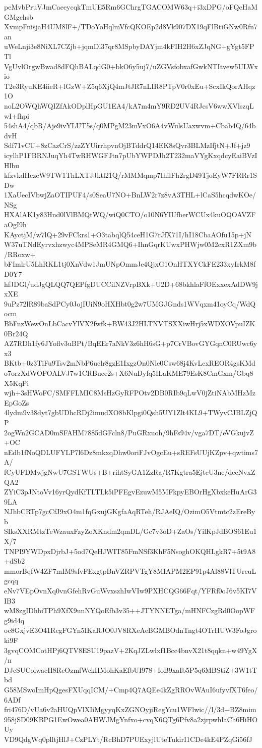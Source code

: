 peMvbPruVJmCaeeycqkTmUE5Rm6GChrgTGACOMW63q+i3xDPG/oFQcHaMGMgchsb
XvmpFnisjaH4UM8lF+/TDoYoHqlmVfcQKOEp2d8Vk907DX19qFlBtiGNw0Rfn7an
uWeLnji3e8NiXL7CZjb+jqmDl37qr8MSpbyDAYjm4kFIH2H6xZJqNG+gYgt5FPTl
VgUvlOrgwBwad8dFQhBALqdG0+bkO6y5uj7/uZGVsfobxafGwkNTItvew5ULWxio
T2e3RyuKE4iieR+lGzW+Z5q6XjQ4mJtJR7nLIR8PTpV0r0xEu+ScxIkQorAHqz1O
noL2OWQhWQIZfAkODplHpGU1EA4/kA7m4mY9RD2UV4RJcsV6wwXVlszqLwI+fhpi
54shA4/qbR/Aje9ivYLUT5s/q0MPgM23mVxO6A4vWulsUaxwvm+Cbab4Q/64bdvH
Sdf71vCU+8zCazCrS/zzZYUirrhpvnOjBTddrQ14EK8sQvr3BLMzIfjtN+Jf+jz9
icylhP1FBRNJuqYh4TwRHWGFJtn7pUbYWPDJh2T232maVYgKxqdcyEaiBVzIHlbu
kfzvkdHczeW9TW1ThLXTJJktl21Q/rMMMqmp7IhilFh2rgD49TjoEyW7FRRr1SDw
1XaUecIVbwjZaOTIPUF4/s0SeaU7NO+BnLW2r7z8vA3THL+lCaS5hcqdwKOe/NSg
HXAlAK1y83Hnd0lVlBMQtWQ/wiQ0CTO/o10N6YIUfherWCUx4kuOQOAVZFaOgI9h
KAyctjM/w7lQ+29vFCkrs1+O3tabqlQ54ceH1G7rJfX71I/hI18CbaAOfu15p+jN
W37uTNdEyrvxhzwyc4MPSeMR4GMQ6+IhnGqrKUwxPHWjw0M2cxR1ZXm9b/RRoxw+
bFImlrU5LhRKL1tj0XnVdw1JmUNpOmmJe4QjxG1OnHTXYCkFE233xyIrkM8fD0Y7
hfJDGl/udJgQLQQ7QEPfgDUCCilNZVrpBXk+U2D+68bkhlaFfOExxexAdDW9jxXE
9uPz72lR89baSdPCy0JojIUiN9oHXHbt0g2w7UMGJGnds1WVqxm41oyCq/WdQocm
BbFnzWewOnLbCacvYlVX2fwfk+BW43J2HLTNVTSXXiwHrj5xWDXOVpuIZK0Br24Q
AZ7RDh1fy6JYoflv3uBPt/BqEEr7aNkV3z6hH6sG+p7CrVBovGYGqnC0RUwc6yx3
BKtb+0z3TiFu9Tsv2mNbP6uclr8gzE1IxgzOn0Nle0Csw68j4KvLcxREOR4gsKMd
o7orzXdWOFOALVJ7w1CRBuce2s+X6NuDyfq5ILaKME79EsK8CmGxm/Gbq8X5KqPi
wjh+3sHWoFC/SMFFLMIC8MsHzGyRFPOtv2DB0RIb9qLwV0jZtiNAbMHzMzEpGoZs
4lydm9v38dyt7gbUDhcRDj2imudXO8bKlpgi0Qsh5UY1Zlt4KL9+TWyvCJBLZjQP
2ogWn2GCAD0mSFAHM7885dGFcln8/PuGRxuoh/9hFs94v/vga7DT/eVGkujvZ+OC
nEdb1fNoQDLUFYLP7l6Dz8mkxqDhw0oriFJvOgcEu+sREFsUUjKZpv+qwtims7A/
fCyUFDMwjgNwU7GSTWUs+B+rihtSyGA1ZzRa/R7Kgtra5EjtcU3ne/deeNvxZQA2
ZYiC3pJNtoVv16yrQydKfTLTLk5iPFEgvEzuwM5MFkpyEBOrHgXbxkeHuArG39LA
NJhbCRTp7gcCfJ9xO4m1fqGxujGKgfaAqRTeh/RJAeIQ/OzimO5Vtmtc2zEreByb
SIksXXRMtzTeWzauxFzyZoXKndm2qmDL/Gc7v3oD+ZaOs/YilKpJdBOS61Eu1X/7
TNPI9YWDpxDjrbJ+5od7QeHJWIT85FmNSf3KhF5NsoghOKQHLgkR7+5t9A8+dSb2
mmorBqfW4ZF7mIM9sfvFExgtpBnVZRPVTgY8MIAPM2EP91p4Al88VlTUrcuLgcqq
eNv7VEpOvnXq0vnGfehRvGuWvxszhIwVIw9PXHCQG66Fqt/YFRf0oJ6v5KI7VIB3
wM8zgIDhbiTPh9XfX9unNYQoEfb3v35++JTYNNETga/mHNFCzgRd0OopWFg9id4q
oc8GxjvE3O41RcgFGYn5IKaRJO0JV8RXeAeBGMBOdnTngt4OTrHUW3FoJgroki9F
3gvqCOMCotHPj6QTV8ESU19pazV+2KqJZLwlxf1Bcc4bnvX21t8qqkn+w49YgX/n
DJcSUColwacH8ReOzmfWckHMohKaEfbUI978+IoB9xaIb5P5q6MBStiZ+3W1tTbd
G58MSwoImHpQgesFXUqqICM/+Cmp4Q7AQEe4kZgRROvWAuI6ufyvfXT6feo/6ADf
fri476D/vUa6v2aHUQpVlXIiMgyyqKxZGNOyjiRegYcu1WFlwic//l/3d+BZ8mim
958jSD09KBPG1EwOwea0AHWJMgYnfxo+cvqX6QTg6Pfv8a2zjrpwhlaCh6HiHOUy
VD9QdgWq0plltjHlJ+CzPLYt/RcBhD7PUExyjlUteTukirI1CDe4kE4PZqGi56fJ
